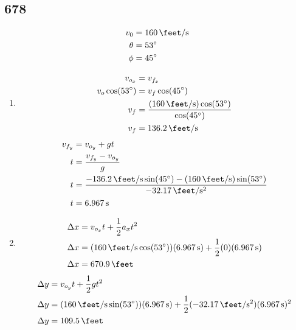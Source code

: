 \documentclass{article}
\begin{document}
\subsection{678}
\begin{align*}
	v_0 & = \SI{160}{\feet \per \second} \\
	\theta & = \SI{53}{\degree} \\
	\phi & = \SI{45}{\degree}
\end{align*}
\begin{enumerate}[label=\textbf{(\alph*)}]
	\item
		\begin{align*}
			v_{o_x} & = v_{f_x} \\
			v_o\cos(\SI{53}{\degree}) & = v_f\cos(\SI{45}{\degree}) \\
			v_f & = \frac{(\SI{160}{\feet \per \second})\cos(\SI{53}{\degree})}{\cos(\SI{45}{\degree})} \\
			v_f & = \SI{136.2}{\feet \per \second}
		\end{align*}
		\begin{align*}
			v_{f_y} & = v_{o_y} + gt \\
			t & = \frac{v_{f_y} - v_{o_y}}{g} \\
			t & = \frac{-\SI{136.2}{\feet \per \second}\sin(\SI{45}{\degree}) - (\SI{160}{\feet \per \second})\sin(\SI{53}{\degree})}{-\SI{32.17}{\feet \per \second \squared}} \\
			t & = \SI{6.967}{\second}
		\end{align*}
	\item
		\begin{align*}
			\Delta x & = v_{o_x}t + \frac{1}{2}a_xt^2 \\
			\Delta x & = (\SI{160}{\feet \per \second}\cos(\SI{53}{\degree}))(\SI{6.967}{\second}) + \frac{1}{2}(0)(\SI{6.967}{\second}) \\
			\Delta x & = \SI{670.9}{\feet}
		\end{align*}
		\begin{align*}
			\Delta y & = v_{o_y}t + \frac{1}{2}gt^2 \\
			\Delta y & = (\SI{160}{\feet \per \second}\sin(\SI{53}{\degree}))(\SI{6.967}{\second}) + \frac{1}{2}(-\SI{32.17}{\feet \per \second \squared})(\SI{6.967}{\second})^2 \\
			\Delta y & = \SI{109.5}{\feet}
		\end{align*}
\end{enumerate}
\end{document}
